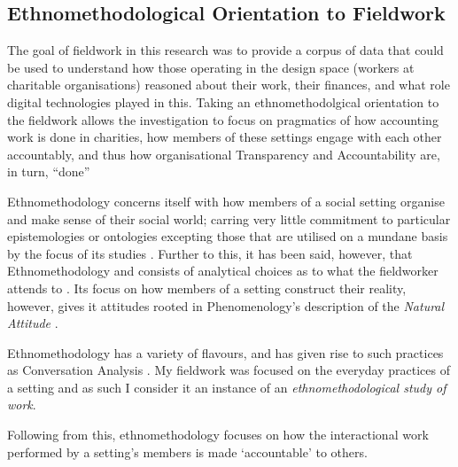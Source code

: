 \subsection{Ethnomethodological Orientation to Fieldwork}
The goal of fieldwork in this research was to provide a corpus of data that could be used to understand how those operating in the design space (workers at charitable organisations) reasoned about their work, their finances, and what role digital technologies played in this. Taking an ethnomethodolgical orientation to the fieldwork allows the investigation to focus on pragmatics of how accounting work is done in charities, how members of these settings engage with each other accountably, and thus how organisational Transparency and Accountability are, in turn, ``done'' \cite{crabtree_doing_2012, garfinkel_studies_1967}

Ethnomethodology concerns itself with how members of a social setting organise and make sense of their social world; carring very little commitment to particular epistemologies or ontologies excepting those that are utilised on a mundane basis by the focus of its studies \cite{randall_fieldwork_2007, garfinkel_studies_1967}. Further to this, it has been said, however, that Ethnomethodology  and consists of analytical choices as to what the fieldworker attends to \cite{randall_fieldwork_2007}. Its focus on how members of a setting construct their reality, however, gives it attitudes rooted in Phenomenology's description of the \textit{Natural Attitude} \cite{sharrock_ethnomethodologists_1986}.


Ethnomethodology has a variety of flavours, and has given rise to such practices as Conversation Analysis . My fieldwork was focused on the everyday practices of a setting and as such I consider it an instance of an \textit{ethnomethodological study of work}.

Following from this, ethnomethodology focuses on how the interactional work performed by a setting's members is made `accountable' to others.


